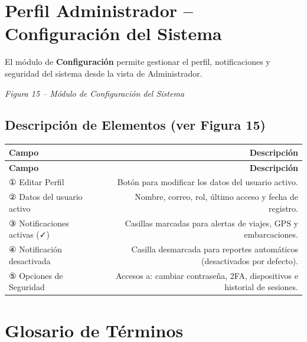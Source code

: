 \documentclass[12pt,a4paper]{article}
\begin{document}
\section{Perfil Administrador -- Configuración del Sistema}

El módulo de \textbf{Configuración} permite gestionar el perfil, notificaciones y seguridad del sistema desde la vista de Administrador.

\textit{Figura 15 -- Módulo de Configuración del Sistema}

\subsection{Descripción de Elementos (ver Figura 15)}

\begin{longtable}{LR}
  \toprule
  \textbf{Campo} & \textbf{Descripción} \\
  \midrule
  \endfirsthead
  \toprule
  \textbf{Campo} & \textbf{Descripción} \\
  \midrule
  \endhead
  \bottomrule
  \endfoot
  ① Editar Perfil              & Botón para modificar los datos del usuario activo. \\[4pt]
  ② Datos del usuario activo   & Nombre, correo, rol, último acceso y fecha de registro. \\[4pt]
  ③ Notificaciones activas (✓) & Casillas marcadas para alertas de viajes, GPS y embarcaciones. \\[4pt]
  ④ Notificación desactivada   & Casilla desmarcada para reportes automáticos (desactivados por defecto). \\[4pt]
  ⑤ Opciones de Seguridad      & Accesos a: cambiar contraseña, 2FA, dispositivos e historial de sesiones. \\
\end{longtable}

\section{Glosario de Términos}
\end{document}
